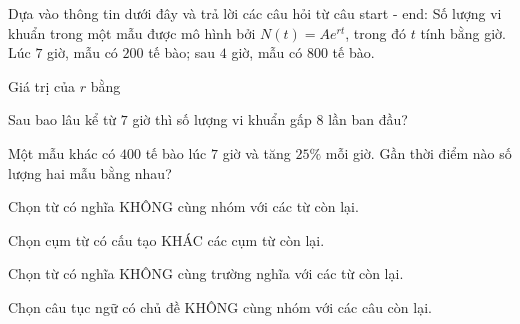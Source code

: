\begin{baidoc}
\item[] Dựa vào thông tin dưới đây và trả lời các câu hỏi từ câu {start} - {end}:
Số lượng vi khuẩn trong một mẫu được mô hình bởi $N(t)=A e^{rt}$, trong đó $t$ tính bằng giờ. Lúc $7$ giờ, mẫu có $200$ tế bào; sau $4$ giờ, mẫu có $800$ tế bào.

\begin{ex}
Giá trị của $r$ bằng
\end{ex}

\begin{ex}
Sau bao lâu kể từ $7$ giờ thì số lượng vi khuẩn gấp $8$ lần ban đầu?
\end{ex}

\begin{ex}
Một mẫu khác có $400$ tế bào lúc $7$ giờ và tăng $25\%$ mỗi giờ. Gần thời điểm nào số lượng hai mẫu bằng nhau?
\end{ex}
\end{baidoc}



\begin{ex}
Chọn từ có nghĩa KHÔNG cùng nhóm với các từ còn lại.
\end{ex}

\begin{ex}
Chọn cụm từ có cấu tạo KHÁC các cụm từ còn lại.
\end{ex}

\begin{ex}
Chọn từ có nghĩa KHÔNG cùng trường nghĩa với các từ còn lại.
\end{ex}

\begin{ex}
Chọn câu tục ngữ có chủ đề KHÔNG cùng nhóm với các câu còn lại.
\end{ex}

